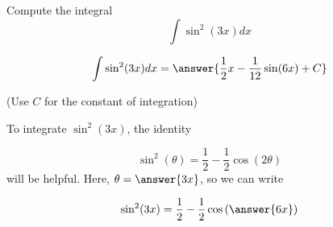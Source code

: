\documentclass{ximera}
\author{Jason Miller}
\begin{document}
\begin{exercise}
Compute the integral
\[
\int \sin^2 (3x)  dx 
\]


\[
\int \sin^2(3x) dx=\answer{\frac{1}{2}x-\frac{1}{12}\sin(6x) +C}
\]

(Use $C$ for the constant of integration)

\begin{hint}
To integrate $\sin^2(3x)$, the identity

\[
\sin^2(\theta) = \frac{1}{2}-\frac{1}{2} \cos(2\theta)
\]
will be helpful.  Here, $\theta = \answer{3x}$, so we can write

\[
\sin^2(3x) = \frac{1}{2}-\frac{1}{2} \cos\left(\answer{6x}\right)
\]
\end{hint}
\end{exercise}
\end{document}
